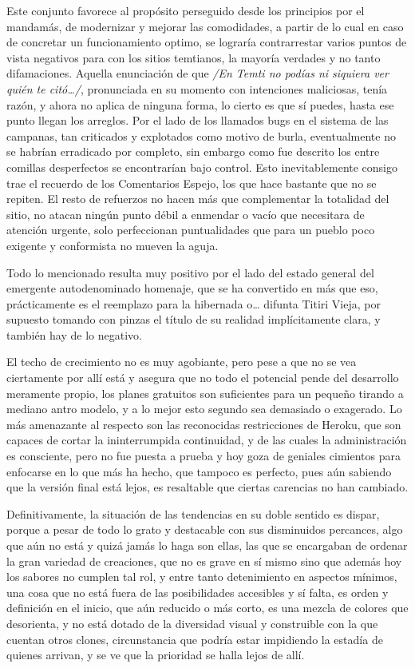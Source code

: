 \documentclass[
]{book}
\begin{document}
Este conjunto favorece al propósito perseguido desde los principios por el mandamás, de modernizar y mejorar las comodidades, a partir de lo cual en caso de concretar un funcionamiento optimo, se lograría contrarrestar varios puntos de vista negativos para con los sitios temtianos, la mayoría verdades y no tanto difamaciones. Aquella enunciación de que \emph{/En Temti no podías ni siquiera ver quién te citó\ldots/}, pronunciada en su momento con intenciones maliciosas, tenía razón, y ahora no aplica de ninguna forma, lo cierto es que sí puedes, hasta ese punto llegan los arreglos. Por el lado de los llamados bugs en el sistema de las campanas, tan criticados y explotados como motivo de burla, eventualmente no se habrían erradicado por completo, sin embargo como fue descrito los entre comillas desperfectos se encontrarían bajo control. Esto inevitablemente consigo trae el recuerdo de los Comentarios Espejo, los que hace bastante que no se repiten. El resto de refuerzos no hacen más que complementar la totalidad del sitio, no atacan ningún punto débil a enmendar o vacío que necesitara de atención urgente, solo perfeccionan puntualidades que para un pueblo poco exigente y conformista no mueven la aguja.

Todo lo mencionado resulta muy positivo por el lado del estado general del emergente autodenominado homenaje, que se ha convertido en más que eso, prácticamente es el reemplazo para la hibernada o\ldots{} difunta Titiri Vieja, por supuesto tomando con pinzas el título de su realidad implícitamente clara, y también hay de lo negativo.

El techo de crecimiento no es muy agobiante, pero pese a que no se vea ciertamente por allí está y asegura que no todo el potencial pende del desarrollo meramente propio, los planes gratuitos son suficientes para un pequeño tirando a mediano antro modelo, y a lo mejor esto segundo sea demasiado o exagerado. Lo más amenazante al respecto son las reconocidas restricciones de Heroku, que son capaces de cortar la ininterrumpida continuidad, y de las cuales la administración es consciente, pero no fue puesta a prueba y hoy goza de geniales cimientos para enfocarse en lo que más ha hecho, que tampoco es perfecto, pues aún sabiendo que la versión final está lejos, es resaltable que ciertas carencias no han cambiado.

Definitivamente, la situación de las tendencias en su doble sentido es dispar, porque a pesar de todo lo grato y destacable con sus disminuidos percances, algo que aún no está y quizá jamás lo haga son ellas, las que se encargaban de ordenar la gran variedad de creaciones, que no es grave en sí mismo sino que además hoy los sabores no cumplen tal rol, y entre tanto detenimiento en aspectos mínimos, una cosa que no está fuera de las posibilidades accesibles y sí falta, es orden y definición en el inicio, que aún reducido o más corto, es una mezcla de colores que desorienta, y no está dotado de la diversidad visual y construible con la que cuentan otros clones, circunstancia que podría estar impidiendo la estadía de quienes arrivan, y se ve que la prioridad se halla lejos de allí.
\end{document}
